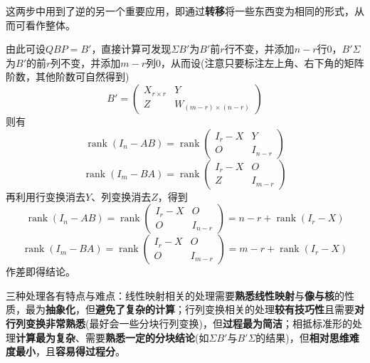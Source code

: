 \documentclass[a4paper,UTF8,fontset=windows]{ctexart}
\DeclareMathOperator{\rank}{rank}
\newcommand*{\note}{\noindent *}
\begin{document}
\begin{enumerate}
    \note 这两步中用到了逆的另一个重要应用，即通过\textbf{转移}将一些东西变为相同的形式，从而可看作整体。

    由此可设$QBP=B'$，直接计算可发现$\Sigma B'$为$B'$前$r$行不变，并添加$n-r$行0，$B'\Sigma$为$B'$的前$r$列不变，并添加$m-r$列0，从而设(注意只要标注左上角、右下角的矩阵阶数，其他阶数可自然得到)
    $$B'=\begin{pmatrix}X_{r\times r}&Y\\Z&W_{(m-r)\times(n-r)}\end{pmatrix}$$
    则有
    $$\rank(I_n-AB)=\rank\begin{pmatrix}I_r-X&Y\\O&I_{n-r}\end{pmatrix}$$
    $$\rank(I_m-BA)=\rank\begin{pmatrix}I_r-X&O\\Z&I_{m-r}\end{pmatrix}$$
    再利用行变换消去$Y$、列变换消去$Z$，得到
    $$\rank(I_n-AB)=\rank\begin{pmatrix}I_r-X&O\\O&I_{n-r}\end{pmatrix}=n-r+\rank(I_r-X)$$
    $$\rank(I_m-BA)=\rank\begin{pmatrix}I_r-X&O\\O&I_{m-r}\end{pmatrix}=m-r+\rank(I_r-X)$$
    作差即得结论。
\end{enumerate}

三种处理各有特点与难点：线性映射相关的处理需要\textbf{熟悉线性映射}与\textbf{像与核}的性质，最为\textbf{抽象化}，但\textbf{避免了复杂的计算}；行列变换相关的处理\textbf{较有技巧性}且需要\textbf{对行列变换非常熟悉}(最好会一些分块行列变换)，但\textbf{过程最为简洁}；相抵标准形的处理\textbf{计算最为复杂}、需要\textbf{熟悉一定的分块结论}(如$\Sigma B'$与$B'\Sigma$的结果)，但\textbf{相对思维难度最小}，且\textbf{容易得过程分}。
\end{document}
